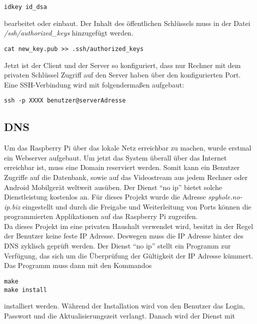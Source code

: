 \begin{lstlisting}
idkey id_dsa
\end{lstlisting}

bearbeitet oder einbaut. Der Inhalt des öffentlichen Schlüssels muss in der Datei \textit{/ssh/authorized\_keys} hinzugefügt werden.

\begin{lstlisting}
cat new_key.pub >> .ssh/authorized_keys
\end{lstlisting}

Jetzt ist der Client und der Server so konfiguriert, dass nur Rechner mit dem privaten Schlüssel Zugriff auf den Server haben über den konfigurierten Port.
Eine SSH-Verbindung wird mit folgendermaßen aufgebaut:
\begin{lstlisting}
ssh -p XXXX benutzer@serverAdresse
\end{lstlisting}

\subsection{DNS}
Um das Raspberry Pi über das lokale Netz erreichbar zu machen, wurde erstmal ein Webserver aufgebaut. Um jetzt das System überall über das Internet erreichbar ist, muss eine Domain reserviert werden. Somit kann ein Benutzer Zugriffe auf die Datenbank, sowie auf das Videostream aus jedem Rechner oder Android Mobilgerät weltweit ausüben. Der Dienst ``no ip'' bietet solche Dienstleistung kostenlos an. Für dieses Projekt wurde die Adresse \textit{spyhole.no-ip.biz} eingestellt und durch die Freigabe und Weiterleitung von Ports können die programmierten Applikationen auf das Raspberry Pi zugreifen.\\

Da dieses Projekt im eine privaten Haushalt verwendet wird, besitzt in der Regel der Benutzer keine feste IP Adresse. Deswegen muss die IP Adresse hinter des DNS zyklisch geprüft werden. Der Dienst ``no ip'' stellt ein Programm zur Verfügung, das sich um die Überprüfung der Gültigkeit der IP Adresse kümmert. Das Programm muss dann mit den Kommandos

\begin{lstlisting}
make
make install
\end{lstlisting}

installiert werden. Während der Installation wird von den Benutzer das Login, Passwort und die Aktualisierungszeit verlangt. Danach wird der Dienst mit


